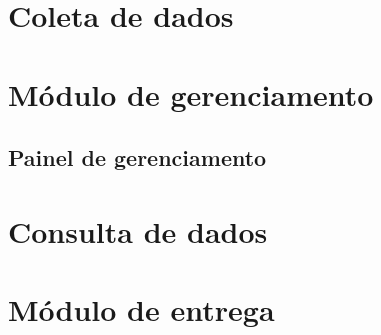 \section{Coleta de dados}



\section{Módulo de gerenciamento}

\subsection{Painel de gerenciamento}

\section{Consulta de dados}

\section{Módulo de entrega}